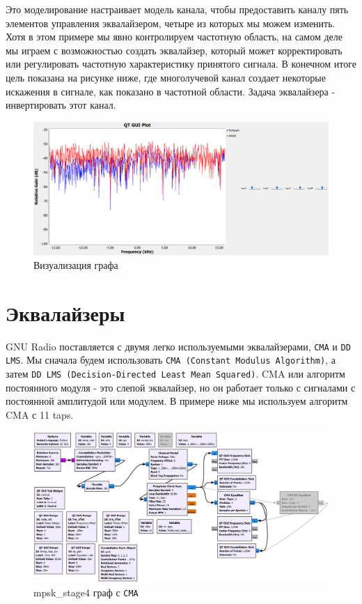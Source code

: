 \documentclass[a4paper,12pt]{report}
\begin{document}
Это моделирование настраивает модель канала, чтобы предоставить каналу пять элементов управления эквалайзером, четыре из которых мы можем изменить. Хотя в этом примере мы явно контролируем частотную область, на самом деле мы играем с возможностью создать эквалайзер, который может корректировать или регулировать частотную характеристику принятого сигнала. В конечном итоге цель показана на рисунке ниже, где многолучевой канал создает некоторые искажения в сигнале, как показано в частотной области. Задача эквалайзера - инвертировать этот канал.

\begin{figure}[H]
        \centering
        \includegraphics[width=1.0\textwidth]{lab12_fig4_2.png}
        \caption{Визуализация графа}
        \label{fig:lab12_fig4_2}
\end{figure}

\chapter{Эквалайзеры}

GNU Radio поставляется с двумя легко используемыми эквалайзерами, \texttt{CMA} и \texttt{DD LMS}. Мы сначала будем использовать \texttt{CMA (Constant Modulus Algorithm)}, а затем \texttt{DD LMS (Decision-Directed Least Mean Squared)}. CMA или алгоритм постоянного модуля - это слепой эквалайзер, но он работает только с сигналами с постоянной амплитудой или модулем. В примере ниже мы используем алгоритм CMA с 11 taps.

\begin{figure}[H]
        \centering
        \includegraphics[width=1.0\textwidth]{lab12_fig5_1.png}
        \caption{mpsk\_stage4 граф с \texttt{CMA}}
        \label{fig:lab12_fig5_1}
\end{figure}
\end{document}
